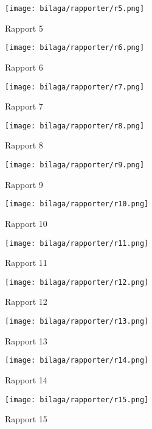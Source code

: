 \begin{figure}[H]
  \centering
  \texttt{[image: bilaga/rapporter/r5.png]}
  \caption{Rapport 5}
\end{figure}

\begin{figure}[H]
  \centering
  \texttt{[image: bilaga/rapporter/r6.png]}
  \caption{Rapport 6}
\end{figure}

\begin{figure}[H]
  \centering
  \texttt{[image: bilaga/rapporter/r7.png]}
  \caption{Rapport 7}
\end{figure}

\begin{figure}[H]
  \centering
  \texttt{[image: bilaga/rapporter/r8.png]}
  \caption{Rapport 8}
\end{figure}

\begin{figure}[H]
  \centering
  \texttt{[image: bilaga/rapporter/r9.png]}
  \caption{Rapport 9}
\end{figure}

\begin{figure}[H]
  \centering
  \texttt{[image: bilaga/rapporter/r10.png]}
  \caption{Rapport 10}
\end{figure}

\begin{figure}[H]
  \centering
  \texttt{[image: bilaga/rapporter/r11.png]}
  \caption{Rapport 11}
\end{figure}

\begin{figure}[H]
  \centering
  \texttt{[image: bilaga/rapporter/r12.png]}
  \caption{Rapport 12}
\end{figure}

\begin{figure}[H]
  \centering
  \texttt{[image: bilaga/rapporter/r13.png]}
  \caption{Rapport 13}
\end{figure}

\begin{figure}[H]
  \centering
  \texttt{[image: bilaga/rapporter/r14.png]}
  \caption{Rapport 14}
\end{figure}

\begin{figure}[H]
  \centering
  \texttt{[image: bilaga/rapporter/r15.png]}
  \caption{Rapport 15}
\end{figure}

